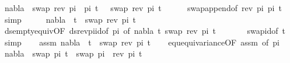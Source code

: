 \begin{isabellebody}
\ {\isachardoublequoteopen}nabla\ {\isasymturnstile}\ swap\ {\isacharparenleft}{\kern0pt}rev\ pi\ {\isacharat}{\kern0pt}\ pi{\isacharparenright}{\kern0pt}\ t{}\ \ {\isasymapprox}\ swap\ {\isacharparenleft}{\kern0pt}rev\ pi{\isacharparenright}{\kern0pt}\ t{}{\isachardoublequoteclose}\isanewline
\ \ \ \ \isamarkupfalse%
\ swap{\isacharunderscore}{\kern0pt}append{\isacharbrackleft}{\kern0pt}of\ {\isacartoucheopen}rev\ pi{\isacartoucheclose}\ pi\ t{}{\isacharbrackright}{\kern0pt}\ \isamarkupfalse%
\ simp\isanewline
\ \ \isamarkupfalse%
\ \isamarkupfalse%
\ {\isachardoublequoteopen}nabla\ {\isasymturnstile}\ t{}\ {\isasymapprox}\ swap\ {\isacharparenleft}{\kern0pt}rev\ pi{\isacharparenright}{\kern0pt}\ t{}{\isachardoublequoteclose}\isanewline
\ \ \ \ \isamarkupfalse%
\ ds{\isacharunderscore}{\kern0pt}empty{\isacharunderscore}{\kern0pt}equiv{\isacharunderscore}{\kern0pt}{}{\isacharbrackleft}{\kern0pt}OF\ ds{\isacharunderscore}{\kern0pt}rev{\isacharunderscore}{\kern0pt}pi{\isacharunderscore}{\kern0pt}id{\isacharbrackleft}{\kern0pt}of\ pi{\isacharbrackright}{\kern0pt}{\isacharcomma}{\kern0pt}\ of\ nabla\ t{}\ {\isacartoucheopen}swap\ {\isacharparenleft}{\kern0pt}rev\ pi{\isacharparenright}{\kern0pt}\ t{}{\isacartoucheclose}{\isacharbrackright}{\kern0pt}\ \isanewline
\ \ \ \ \ \ swap{\isacharunderscore}{\kern0pt}id{\isacharbrackleft}{\kern0pt}of\ t{}{\isacharbrackright}{\kern0pt}\ \isamarkupfalse%
\ simp\isakeywordONE{{\isacharbraceright}{\kern0pt}}\isamarkupfalse%
\isanewline
\isanewline
\ \ \isakeywordONE{{\isacharbraceleft}{\kern0pt}}\isamarkupfalse%
\isamarkupfalse%
\ assm{}{\isacharcolon}{\kern0pt}\ {\isachardoublequoteopen}nabla\ {\isasymturnstile}\ t{}\ {\isasymapprox}\ swap\ {\isacharparenleft}{\kern0pt}rev\ pi{\isacharparenright}{\kern0pt}\ t{}{\isachardoublequoteclose}\isanewline
\ \ \isamarkupfalse%
\ equ{\isacharunderscore}{\kern0pt}equivariance{\isacharbrackleft}{\kern0pt}OF\ assm{}{\isacharcomma}{\kern0pt}\ of\ pi{\isacharbrackright}{\kern0pt}\isanewline
\ \ \isamarkupfalse%
\ {\isachardoublequoteopen}nabla\ {\isasymturnstile}\ swap\ pi\ t{}\ {\isasymapprox}\ swap\ {\isacharparenleft}{\kern0pt}pi\ {\isacharat}{\kern0pt}\ rev\ pi{\isacharparenright}{\kern0pt}\ t{}{\isachardoublequoteclose}\isanewline

\end{isabellebody}
